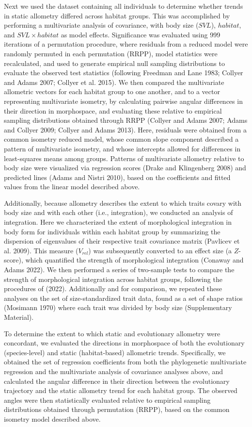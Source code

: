 \documentclass[
  11pt,
]{article}
\begin{document}
Next we used the dataset containing all individuals to determine whether
trends in static allometry differed across habitat groups. This was
accomplished by performing a multivariate analysis of covariance, with
body size (\(SVL\)), \(habitat\), and \(SVL \times habitat\) as model
effects. Significance was evaluated using 999 iterations of a
permutation procedure, where residuals from a reduced model were
randomly permuted in each permutation (RRPP), model statistics were
recalculated, and used to generate empirical null sampling distributions
to evaluate the observed test statistics (following Freedman and Lane
1983; Collyer and Adams 2007; Collyer et al. 2015). We then compared the
multivariate allometric vectors for each habitat group to one another,
and to a vector representing multivariate isometry, by calculating
pairwise angular differences in their direction in morphospace, and
evaluating these relative to empirical sampling distributions obtained
through RRPP (Collyer and Adams 2007; Adams and Collyer 2009; Collyer
and Adams 2013). Here, residuals were obtained from a common isometry
reduced model, whose common slope component described a pattern of
multivariate isometry, and whose intercepts allowed for differences in
least-squares means among groups. Patterns of multivariate allometry
relative to body size were visualized via regression scores (Drake and
Klingenberg 2008) and predicted lines (Adams and Nistri 2010), based on
the coefficients and fitted values from the linear model described
above. \hfill\break

Additionally, because allometry describes the extent to which traits
covary with body size and with each other (i.e., integration), we
conducted an analysis of integration. Here we characterized the extent
of morphological integration in body form for individuals within each
habitat group by summarizing the dispersion of eigenvalues of their
respective trait covariance matrix (Pavlicev et al. 2009). This measure
(\(V_{rel}\)) was subsequently converted to an effect size (a
\(Z\)-score), which quantified the strength of morphological integration
(Conaway and Adams 2022). We then performed a series of two-sample tests
to compare the strength of morphological integration across habitat
groups, following the procedures of (2022). Additionally and for
comparison, we repeated these analyses on the set of size-standardized
trait data, found as a set of shape ratios (Mosimann 1970) where each
trait was divided by body size (Supplementary Material). \hfill\break

To determine the extent to which static and evolutionary allometry were
concordant, we evaluated the directions in morphospace of both the
evolutionary (species-level) and static (habitat-based) allometric
trends. Specifically, we obtained the set of regression coefficients
from both the phylogenetic multivariate regression and the multivariate
analysis of covariance analyses above, and calculated the angular
difference in their direction between the evolutionary trajectory and
the static allometry trend for each habitat group. The observed angles
were then statistically evaluated relative to empirical sampling
distributions obtained through permutation (RRPP), based on the common
isometry model described above. \hfill\break
\end{document}
